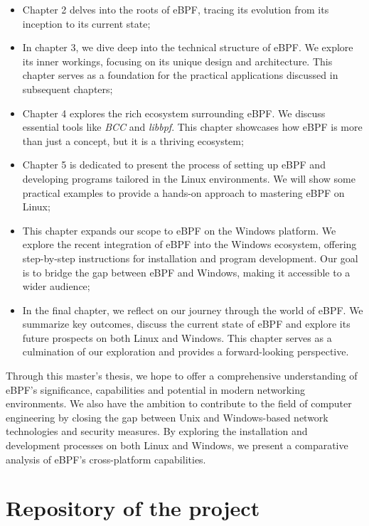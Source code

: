 \begin{itemize}
	\item 
		Chapter 2 delves into the roots of eBPF, tracing its evolution from its inception to its current state;
	\item 
		In chapter 3, we dive deep into the technical structure of eBPF. 
		We explore its inner workings, focusing on its unique design and architecture.
		This chapter serves as a foundation for the practical applications discussed in subsequent chapters;
	\item 
		Chapter 4 explores the rich ecosystem surrounding eBPF. 
		We discuss essential tools like \textit{BCC} and \textit{libbpf}.
		This chapter showcases how eBPF is more than just a concept, but it is a thriving ecosystem;
	\item 
		Chapter 5 is dedicated to present the process of setting up eBPF and developing programs tailored in the Linux environments. 
		We will show some practical examples to provide a hands-on approach to mastering eBPF on Linux;
	\item 
		This chapter expands our scope to eBPF on the Windows platform. 
		We explore the recent integration of eBPF into the Windows ecosystem, offering step-by-step instructions for installation and program development. 
		Our goal is to bridge the gap between eBPF and Windows, making it accessible to a wider audience;
	\item 
		In the final chapter, we reflect on our journey through the world of eBPF. 
		We summarize key outcomes, discuss the current state of eBPF and explore its future prospects on both Linux and Windows. 
		This chapter serves as a culmination of our exploration and provides a forward-looking perspective.
\end{itemize}

Through this master's thesis, we hope to offer a comprehensive understanding of eBPF's significance, capabilities and potential in modern networking environments.
We also have the ambition to contribute to the field of computer engineering by closing the gap between Unix and Windows-based network technologies and security measures.
By exploring the installation and development processes on both Linux and Windows, we present a comparative analysis of eBPF's cross-platform capabilities.

\section{Repository of the project}

